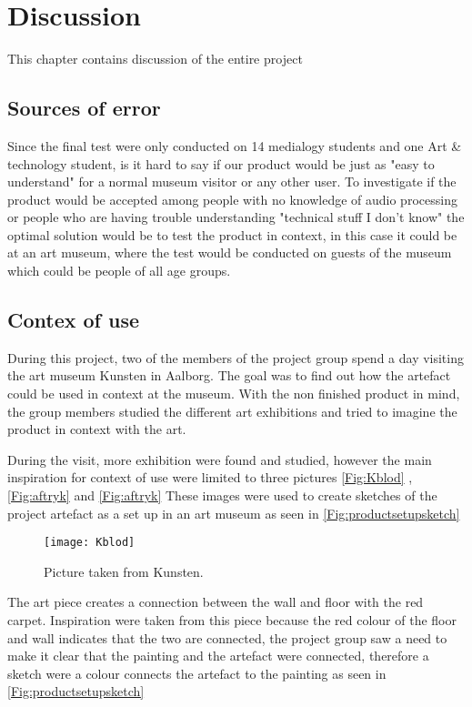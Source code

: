 \chapter{Discussion}\label{ch:discussion}
This chapter contains discussion of the entire project 

\section{Sources of error}

 Since the final test were only conducted on 14 medialogy students and one Art \& technology student, is it hard to say if our product would be just as "easy to understand" for a normal museum visitor or any other user. To investigate if the product would be accepted among people with no knowledge of audio processing or people who are having trouble understanding "technical stuff I don't know" the optimal solution would be to test the product in context, in this case it could be at an art museum, where the test would be conducted on guests of the museum which could be people of all age groups. 
 
 \section{Contex of use}
During this project, two of the members of the project group spend a day visiting the art museum Kunsten in Aalborg. The goal was to find out how the artefact could be used in context at the museum. With the non finished product in mind, the group members studied the different art exhibitions and tried to imagine the product in context with the art. 

During the visit, more exhibition were found and studied, however the main inspiration for context of use were limited to three pictures \ref{Fig:Kblod} , \ref{Fig:aftryk} and \ref{Fig:aftryk} These images were used to create sketches of the project artefact as a set up in an art museum as seen in \ref{Fig:productsetupsketch}

\begin{figure}[!h] 
\centering
\texttt{[image: Kblod]}
\caption{\label{fig:Kblod} Picture taken from Kunsten.}
\end{figure}
The art piece creates a connection between the wall and floor with the red carpet. Inspiration were taken from this piece because the red colour of the floor and wall indicates that the two are connected, the project group saw a need to make it clear that the painting and the artefact were connected, therefore a sketch were a colour connects the artefact to the painting as seen in \ref{Fig:productsetupsketch}


